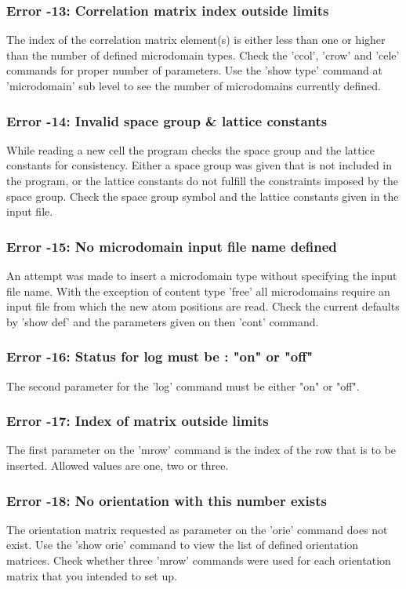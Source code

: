 \subsubsection{Error -13: Correlation matrix index outside limits}
\par
The index of the correlation matrix element(s) is either less than 
one or higher than the number of defined microdomain types. 
Check the 'ccol', 'crow' and 'cele' commands for proper number of 
parameters. Use the 'show type' command at 'microdomain' sub level 
to see the number of microdomains currently defined. 
\subsubsection{Error -14: Invalid space group \& lattice constants}
\par
While reading a new cell the program checks the space group and the 
lattice constants for consistency. Either a space group was given 
that is not included in the program, or the lattice constants do 
not fulfill the constraints imposed by the space group. Check the 
space group symbol and the lattice constants given in the input file. 
\subsubsection{Error -15: No microdomain input file name defined}
\par
An attempt was made to insert a microdomain type without specifying 
the input file name. With the exception of content type 'free' all 
microdomains require an input file from which the new atom positions 
are read. 
Check the current defaults by 'show def' and the parameters given on 
then 'cont' command. 
\subsubsection{Error -16: Status for log must be : "on" or "off"}
\par
The second parameter for the 'log' command must be either "on" or 
"off". 
\subsubsection{Error -17: Index of matrix outside limits}
\par
The first parameter on the 'mrow' command is the index of the row 
that is to be inserted. Allowed values are one, two or three. 
\subsubsection{Error -18: No orientation with this number exists}
\par
The orientation matrix requested as parameter on the 'orie' command 
does not exist. Use the 'show orie' command to view the list of 
defined orientation matrices. Check whether three 'mrow' commands 
were used for each orientation matrix that you intended to set up. 
